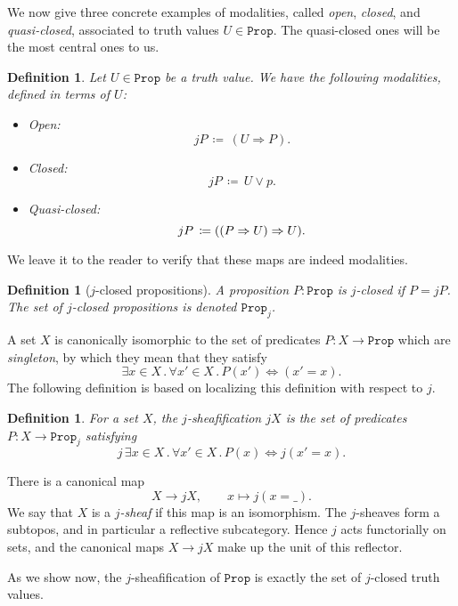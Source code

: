 \documentclass[reqno,11pt]{amsproc}
\theoremstyle{plain}
\newtheorem{definition}[theorem]{Definition}
\theoremstyle{definition}
\newcommand{\Const}[1]{\mathtt{#1}}
\renewcommand{\to}[1][]{\xrightarrow{#1}}
\newcommand{\prop}{\Const{Prop}}
\newcommand{\imp}{\Rightarrow}
\let\originalleft\left
\let\originalright\right
\renewcommand{\left}{\mathopen{}\mathclose\bgroup\originalleft}
\renewcommand{\right}{\aftergroup\egroup\originalright}
\newcommand{\beq}{\begin{equation}}
\newcommand{\eeq}{\end{equation}}
\numberwithin{equation}{section}
\begin{document}
We now give three concrete examples of modalities, called \emph{open}, \emph{closed}, and \emph{quasi-closed}, associated to truth values $U \in \prop$. The quasi-closed ones will be the most central ones to us.

\begin{definition}
	\label{def.open_closed_qc}
	Let $U \in \prop$ be a truth value. We have the following modalities, defined in terms of $U$:
	\begin{itemize}
		\item Open:
			\[
				jP \, \coloneqq \, (U \imp P).
			\]
		\item Closed:
			\[
				jP \, \coloneqq \, U \lor p.
			\]
		\item Quasi-closed:
			\[
				jP \, \coloneqq \left( (P \imp U) \imp U \right).
			\]
	\end{itemize}
\end{definition}

We leave it to the reader to verify that these maps are indeed modalities.

\begin{definition}[$j$-closed propositions]\label{def.j_closed_props}
	A proposition $P : \prop$ is \emph{$j$-closed} if $P = jP$. The set of $j$-closed propositions is denoted $\prop_j$.
\end{definition}

A set $X$ is canonically isomorphic to the set of predicates $P : X \to \prop$ which are \emph{singleton}, by which they mean that they satisfy
\[
	\exists x \in X \, . \, \forall x' \in X \, . \, P(x') \Leftrightarrow (x' = x).
\]
The following definition is based on localizing this definition with respect to $j$.

\begin{definition}
	For a set $X$, the \emph{$j$-sheafification} $jX$ is the set of predicates $P : X \to \prop_j$ satisfying 
	\beq
		\label{j_singleton}
		j \, \exists x \in X \, . \, \forall x' \in X \, . \, P(x) \Leftrightarrow j(x' = x).
	\eeq
\end{definition}

There is a canonical map
\[
	X \longrightarrow jX, \qquad x \longmapsto j(x = \_).
\]
We say that $X$ is a \emph{$j$-sheaf} if this map is an isomorphism. The $j$-sheaves form a subtopos, and in particular a reflective subcategory. Hence $j$ acts functorially on sets, and the canonical maps $X \to jX$ make up the unit of this reflector.

As we show now, the $j$-sheafification of $\prop$ is exactly the set of $j$-closed truth values.
\end{document}
